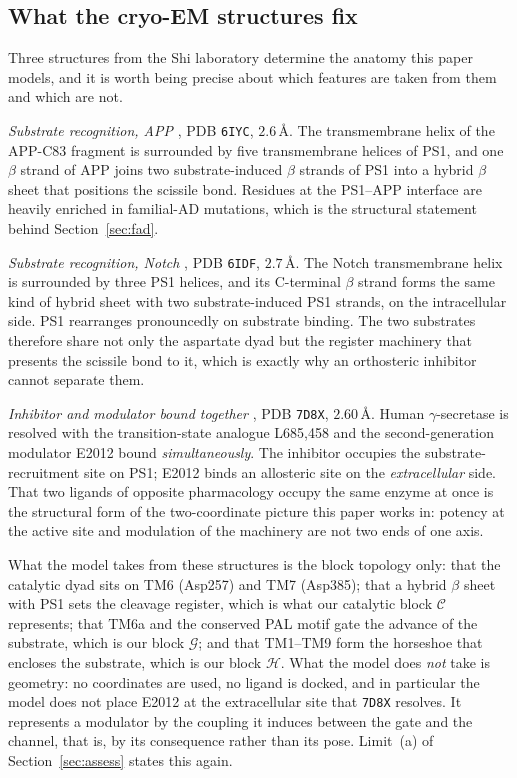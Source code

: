 \documentclass[11pt,reqno]{amsart}
\theoremstyle{plain}
\theoremstyle{definition}
\theoremstyle{remark}
\numberwithin{equation}{section}
\newcommand{\CC}{\mathcal{C}}
\newcommand{\GG}{\mathcal{G}}
\newcommand{\HH}{\mathcal{H}}
\begin{document}
\subsection{What the cryo-EM structures fix}
\label{sec:cryoem}
Three structures from the Shi laboratory determine the anatomy this paper models, and it is worth being precise about which features are taken from them and which are not.

\emph{Substrate recognition, APP} \cite{Zhou2019}, PDB \texttt{6IYC}, $2.6$\,\AA. The transmembrane helix of the APP-C83 fragment is surrounded by five transmembrane helices of PS1, and one $\beta$ strand of APP joins two substrate-induced $\beta$ strands of PS1 into a hybrid $\beta$ sheet that positions the scissile bond. Residues at the PS1--APP interface are heavily enriched in familial-AD mutations, which is the structural statement behind Section~\ref{sec:fad}.

\emph{Substrate recognition, Notch} \cite{Yang2019}, PDB \texttt{6IDF}, $2.7$\,\AA. The Notch transmembrane helix is surrounded by three PS1 helices, and its C-terminal $\beta$ strand forms the same kind of hybrid sheet with two substrate-induced PS1 strands, on the intracellular side. PS1 rearranges pronouncedly on substrate binding. The two substrates therefore share not only the aspartate dyad but the register machinery that presents the scissile bond to it, which is exactly why an orthosteric inhibitor cannot separate them.

\emph{Inhibitor and modulator bound together} \cite{Yang2021}, PDB \texttt{7D8X}, $2.60$\,\AA. Human $\gamma$-secretase is resolved with the transition-state analogue L685,458 and the second-generation modulator E2012 bound \emph{simultaneously}. The inhibitor occupies the substrate-recruitment site on PS1; E2012 binds an allosteric site on the \emph{extracellular} side. That two ligands of opposite pharmacology occupy the same enzyme at once is the structural form of the two-coordinate picture this paper works in: potency at the active site and modulation of the machinery are not two ends of one axis.

What the model takes from these structures is the block topology only: that the catalytic dyad sits on TM6 (Asp257) and TM7 (Asp385); that a hybrid $\beta$ sheet with PS1 sets the cleavage register, which is what our catalytic block $\CC$ represents; that TM6a and the conserved PAL motif gate the advance of the substrate, which is our block $\GG$; and that TM1--TM9 form the horseshoe that encloses the substrate, which is our block $\HH$. What the model does \emph{not} take is geometry: no coordinates are used, no ligand is docked, and in particular the model does not place E2012 at the extracellular site that \texttt{7D8X} resolves. It represents a modulator by the coupling it induces between the gate and the channel, that is, by its consequence rather than its pose. Limit~(a) of Section~\ref{sec:assess} states this again.
\end{document}
